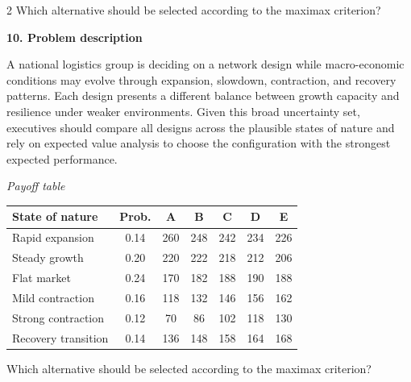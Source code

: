 \documentclass[12pt]{article}
\newcommand{\SubsectionBox}[1]{%
	\noindent\colorbox{gray!30}{%
		\parbox{\linewidth}{\textbf{#1}}%
	}\par\vspace{0.35cm}%
}
\begin{document}
\begin{multicols}{2}
				Which alternative should be selected according to the maximax criterion?

		\vspace{0.25cm}
		\SubsectionBox{10. Problem description}\vspace{-0.25cm}
		A national logistics group is deciding on a network design while macro-economic conditions may evolve through expansion, slowdown, contraction, and recovery patterns. Each design presents a different balance between growth capacity and resilience under weaker environments. Given this broad uncertainty set, executives should compare all designs across the plausible states of nature and rely on expected value analysis to choose the configuration with the strongest expected performance.
		
				\begin{center}
					\textit{Payoff table}
					\begin{tabular}{l c c c c c c}
						\toprule
						State of nature & Prob. & A & B & C & D & E \\
						\midrule
						Rapid expansion & 0.14 & 260 & 248 & 242 & 234 & 226 \\
						Steady growth & 0.20 & 220 & 222 & 218 & 212 & 206 \\
						Flat market & 0.24 & 170 & 182 & 188 & 190 & 188 \\
						Mild contraction & 0.16 & 118 & 132 & 146 & 156 & 162 \\
						Strong contraction & 0.12 & 70 & 86 & 102 & 118 & 130 \\
						Recovery transition & 0.14 & 136 & 148 & 158 & 164 & 168 \\
						\bottomrule
					\end{tabular}
				\end{center}
		
				Which alternative should be selected according to the maximax criterion?

	\end{multicols}
\end{document}
